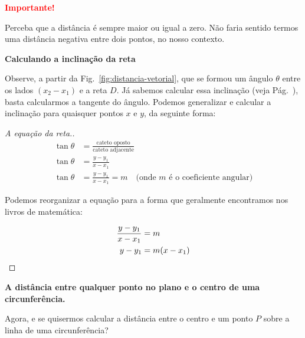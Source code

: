 \documentclass[12pt,openright,twoside,a4paper]{article}
\theoremstyle{definition}
\begin{document}
	\begin{snugshade}
		\textbf{\textcolor{red}{Importante!}}
	
		Perceba que a distância é sempre maior ou igual a zero. Não faria sentido termos uma distância negativa entre dois pontos, no nosso contexto.
	\end{snugshade}
	
	\textbf{Calculando a inclinação da reta}
	
	Observe, a partir da Fig.~\ref{fig:distancia-vetorial}, que se formou um ângulo $\theta$ entre os lados $(x_2 - x_1)$ e a reta $D$. Já sabemos calcular essa inclinação (veja Pág.~\pageref{tema:coef_angular}), basta calcularmos a tangente do ângulo. Podemos generalizar e calcular a inclinação para quaisquer pontos $x$ e $y$, da seguinte forma:
	
	\begin{proof}[A equação da reta.]
		\begin{align*}
			\tan{\theta} &= \frac{\text{cateto oposto}}{\text{cateto adjacente}}\\
			\tan{\theta} &= \frac{y - y_1}{x - x_1}\\
			\tan{\theta} &= \frac{y - y_1}{x - x_1}=m \quad \text{(onde $m$ é o coeficiente angular)}
		\end{align*}
		
		Podemos reorganizar a equação para a forma que geralmente encontramos nos livros de matemática:
		
		\begin{align*}
			\frac{y - y_1}{x - x_1} &= m\\
			y - y_1 &= m(x - x_1) \qedhere
		\end{align*}
	\end{proof}
	
	\textbf{A distância entre qualquer ponto no plano e o centro de uma circunferência.}
	
	Agora, e se quisermos calcular a distância entre o centro e um ponto $P$ sobre a linha de uma circunferência?
	
\end{document}
